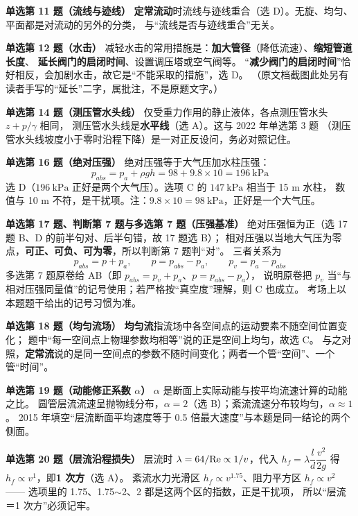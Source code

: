 \noindent\textbf{单选第 11 题（流线与迹线）}\quad
\textbf{定常流动}时流线与迹线重合（选 D）。无旋、均匀、平面都是对流动的另外的分类，
与“流线是否与迹线重合”无关。

\noindent\textbf{单选第 12 题（水击）}\quad
减轻水击的常用措施是：\textbf{加大管径}（降低流速）、\textbf{缩短管道长度}、
\textbf{延长阀门的启闭时间}、设置调压塔或空气阀等。
“\textbf{减少阀门的启闭时间}”恰好相反，会加剧水击，故它是“不能采取的措施”，选 D。
（原文档截图此处另有读者手写的“延长”二字，属批注，不是原题文字。）

\noindent\textbf{单选第 14 题（测压管水头线）}\quad
仅受重力作用的静止液体，各点测压管水头 $z+p/\gamma$ 相同，
测压管水头线是\textbf{水平线}（选 A）。这与 2022 年单选第 3 题
（测压管水头线坡度小于零时沿程下降）是一对正反设问，务必对照记住。

\noindent\textbf{单选第 16 题（绝对压强）}\quad
绝对压强等于大气压加水柱压强：
\[ p_{abs}=p_a+\rho gh=98+9.8\times10=196\ \mathrm{kPa} \]
选 D（$196\ \mathrm{kPa}$ 正好是两个大气压）。选项 C 的 $147\ \mathrm{kPa}$ 相当于 15 m 水柱，
数值与 10 m 不符，是干扰项。注：$9.8\times10=98\ \mathrm{kPa}$，正好是一个大气压。

\noindent\textbf{单选第 17 题、判断第 7 题与多选第 7 题（压强基准）}\quad
绝对压强恒为正（选 17 题 B、D 的前半句对、后半句错，故 17 题选 B）；
相对压强以当地大气压为零点，\textbf{可正、可负、可为零}，所以判断第 7 题判“对”。
三者关系为
\[ p_{abs}=p+p_a,\qquad p=p_{abs}-p_a,\qquad p_v=p_a-p_{abs} \]
多选第 7 题原卷给 AB（即 $p_{abs}=p_v+p_a$、$p=p_{abs}-p_a$），
说明原卷把 $p_v$ 当“与相对压强同量值”的记号使用；若严格按“真空度”理解，则 C 也成立。
考场上以本题题干给出的记号习惯为准。

\noindent\textbf{单选第 18 题（均匀流场）}\quad
\textbf{均匀流}指流场中各空间点的运动要素不随空间位置变化；
题中“每一空间点上物理参数均相等”说的正是空间上均匀，故选 C。
与之对照，\textbf{定常流}说的是同一空间点的参数不随时间变化；两者一个管“空间”、一个管“时间”。

\noindent\textbf{单选第 19 题（动能修正系数 $\alpha$）}\quad
$\alpha$ 是断面上实际动能与按平均流速计算的动能之比。
圆管层流流速呈抛物线分布，$\alpha=2$（选 B）；紊流流速分布较均匀，$\alpha\approx1$。
2015 年填空“层流断面平均速度等于 0.5 倍最大速度”与本题是同一结论的两个侧面。

\noindent\textbf{单选第 20 题（层流沿程损失）}\quad
层流时 $\lambda=64/\mathrm{Re}\propto1/v$，代入 $h_f=\lambda\dfrac{l}{d}\dfrac{v^2}{2g}$ 得
$h_f\propto v^{1}$，即\textbf{1 次方}（选 A）。
紊流水力光滑区 $h_f\propto v^{1.75}$、阻力平方区 $h_f\propto v^{2}$——
选项里的 1.75、1.75$\sim$2、2 都是这两个区的指数，正是干扰项，
所以“层流＝1 次方”必须记牢。

